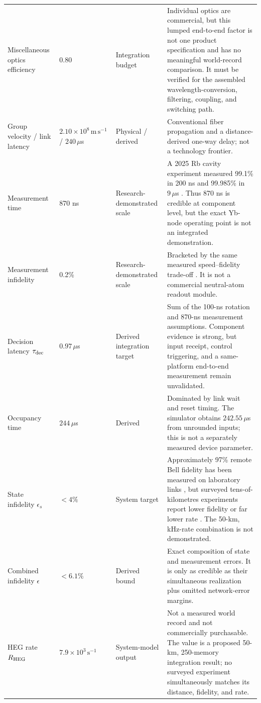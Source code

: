 \documentclass[10pt]{article}
\begin{document}
\begin{longtable}{L{0.19\textwidth}L{0.12\textwidth}L{0.18\textwidth}L{0.39\textwidth}}
  Miscellaneous optics efficiency & 0.80 & Integration budget & Individual optics are commercial, but this lumped end-to-end factor is not one product specification and has no meaningful world-record comparison.  It must be verified for the assembled wavelength-conversion, filtering, coupling, and switching path. \\
  Group velocity / link latency & $2.10\times10^8\,\mathrm{m\,s^{-1}}$ / $240\,\mu$s & Physical / derived & Conventional fiber propagation and a distance-derived one-way delay; not a technology frontier. \\
  Measurement time & 870 ns & Research-demonstrated scale & A 2025 Rb cavity experiment measured 99.1\% in 200 ns and 99.985\% in $9\,\mu$s \cite{wang2025}.  Thus 870 ns is credible at component level, but the exact Yb-node operating point is not an integrated demonstration. \\
  Measurement infidelity & 0.2\% & Research-demonstrated scale & Bracketed by the same measured speed--fidelity trade-off \cite{wang2025}.  It is not a commercial neutral-atom readout module. \\
  Decision latency $\tau_{\rm dec}$ & $0.97\,\mu$s & Derived integration target & Sum of the 100-ns rotation and 870-ns measurement assumptions.  Component evidence is strong, but input receipt, control triggering, and a same-platform end-to-end measurement remain unvalidated. \\
  Occupancy time & $244\,\mu$s & Derived & Dominated by link wait and reset timing.  The simulator obtains $242.55\,\mu$s from unrounded inputs; this is not a separately measured device parameter. \\
  State infidelity $\epsilon_s$ & $<4\%$ & System target & Approximately 97\% remote Bell fidelity has been measured on laboratory links \cite{main2025,saha2025}, but surveyed tens-of-kilometres experiments report lower fidelity or far lower rate \cite{vanleent2022,knaut2024}.  The 50-km, kHz-rate combination is not demonstrated. \\
  Combined infidelity $\epsilon$ & $<6.1\%$ & Derived bound & Exact composition of state and measurement errors.  It is only as credible as their simultaneous realization plus omitted network-error margins. \\
  HEG rate $R_{\rm HEG}$ & $7.9\times10^3\,\mathrm{s}^{-1}$ & System-model output & Not a measured world record and not commercially purchasable.  The value is a proposed 50-km, 250-memory integration result; no surveyed experiment simultaneously matches its distance, fidelity, and rate. \\
\end{longtable}
\end{document}
